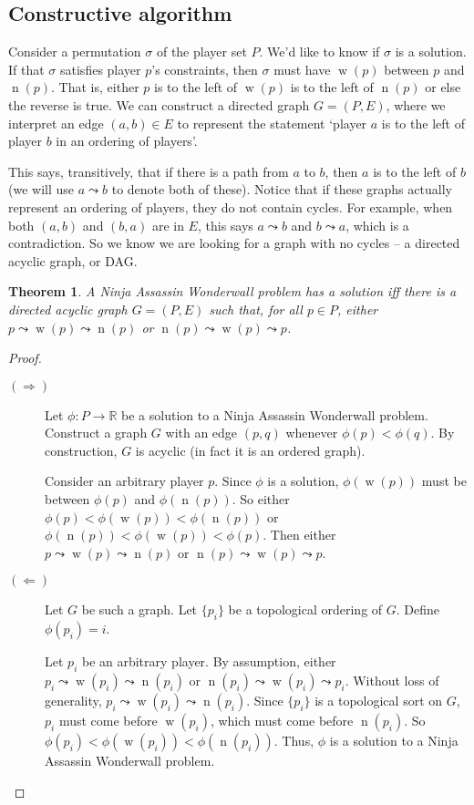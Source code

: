 \documentclass[12pt,x11names, rgb]{article}
\newtheorem*{thm}{Theorem}
\DeclareMathOperator{\w}{w}
\DeclareMathOperator{\n}{n}
\begin{document}
\subsection{Constructive algorithm}
    \label{sec:algorithm}
    Consider a permutation $\sigma$ of the player set $P$. We'd like to know if $\sigma$ is a solution. If that $\sigma$ satisfies player $p$'s constraints, then $\sigma$ must have $\w(p)$ between $p$ and $\n(p)$. That is, either $p$ is to the left of $\w(p)$ is to the left of $\n(p)$ or else the reverse is true. We can construct a directed graph $G=(P,E)$, where we interpret an edge $(a,b) \in E$ to represent the statement `player $a$ is to the left of player $b$ in an ordering of players'. 

    This says, transitively, that if there is a path from $a$ to $b$, then $a$ is to the left of $b$ (we will use $a \leadsto b$ to denote both of these). Notice that if these graphs actually represent an ordering of players, they do not contain cycles. For example, when both $(a,b)$ and $(b,a)$ are in $E$, this says $a \leadsto b$ and $b \leadsto a$, which is a contradiction. So we know we are looking for a graph with no cycles -- a directed acyclic graph, or DAG.

    \begin{thm}
    A Ninja Assassin Wonderwall problem has a solution iff there is a directed acyclic graph $G=(P,E)$ such that, for all $p\in P$, either  $p \leadsto \w(p) \leadsto \n(p)$ or $\n(p) \leadsto \w(p) \leadsto p$.
    \end{thm}
    \begin{proof} \mbox{}

    \begin{description}
    \item[$(\Rightarrow)$] Let $\phi: P \to \mathbb{R}$ be a solution to a Ninja Assassin Wonderwall problem. Construct a graph $G$ with an edge $(p,q)$ whenever $\phi(p)<\phi(q)$. By construction, $G$ is acyclic (in fact it is an ordered graph).

    Consider an arbitrary player $p$. Since $\phi$ is a solution, $\phi(\w(p))$ must be between $\phi(p)$ and $\phi(\n(p))$. So either $\phi(p) < \phi(\w(p)) < \phi(\n(p))$ or $\phi(\n(p)) < \phi(\w(p)) < \phi(p)$. Then either $p \leadsto \w(p) \leadsto \n(p)$ or $\n(p) \leadsto \w(p) \leadsto p$.

    \item[$(\Leftarrow)$] Let $G$ be such a graph. Let $\{p_i\}$ be a topological ordering of $G$. Define $\phi(p_i) = i$. 

    Let $p_i$ be an arbitrary player. By assumption, either $p_i \leadsto \w(p_i) \leadsto \n(p_i)$ or $\n(p_i) \leadsto \w(p_i) \leadsto p_i$. Without loss of generality, $p_i \leadsto \w(p_i) \leadsto \n(p_i)$. Since $\{p_i\}$ is a topological sort on $G$, $p_i$ must come before $\w(p_i)$, which must come before $\n(p_i)$. So $\phi(p_i) < \phi(\w(p_i)) < \phi(\n(p_i))$. Thus, $\phi$ is a solution to a Ninja Assassin Wonderwall problem.
    \end{description}
    \end{proof}
\end{document}
